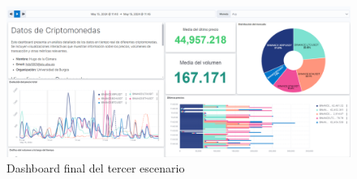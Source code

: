 \begin{figure}
    \centering
    \includegraphics[width=1\linewidth]{img/escenario4-1.png}
    \caption{Dashboard final del tercer escenario}
    \label{fig:escenario3}
\end{figure}
\paragraph{ }
\paragraph{ }
\paragraph{ }
\paragraph{ }
\paragraph{ }
\paragraph{ }
\paragraph{ }
\paragraph{ }
\paragraph{ }
\paragraph{ }
\paragraph{ }
